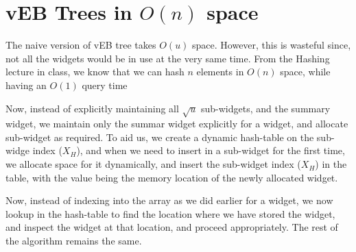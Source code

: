 \documentclass{article}
\begin{document}
\clearpage

\section{vEB Trees in $O(n)$ space}
The naive version of vEB tree takes $O(u)$ space. However, this is wasteful since, not all
the widgets would be in use at the very same time. From the Hashing lecture in class, we 
know that we can hash $n$ elements in $O(n)$ space, while having an $O(1)$ query time 

Now, instead of explicitly maintaining all $\sqrt{u}$ sub-widgets, and the summary widget, 
we maintain only the summar widget explicitly for a widget, and allocate sub-widget as required.
To aid us, we create a dynamic hash-table on the sub-widge index ($X_H$), and when we need to insert
in a sub-widget for the first time, we allocate space for it dynamically, and insert the 
sub-widget index ($X_H$) in the table, with the value being the memory location of the newly
allocated widget.

Now, instead of indexing into the array as we did earlier for a widget, we now lookup in the 
hash-table to find the location where we have stored the widget, and inspect the widget at that 
location, and proceed appropriately. The rest of the algorithm remains the same.
\end{document}
